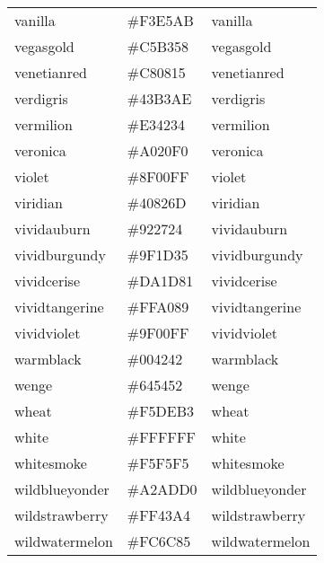 \documentclass[
]{article}
\begin{document}
\begin{longtable}[]{@{}lll@{}}
vanilla & \colorbox[rgb]{0.95,0.9,0.67}{\#F3E5AB} &
\textcolor[rgb]{0.95,0.9,0.67}{vanilla               }\tabularnewline
vegasgold & \colorbox[rgb]{0.77,0.7,0.35}{\#C5B358} &
\textcolor[rgb]{0.77,0.7,0.35}{vegasgold             }\tabularnewline
venetianred & \colorbox[rgb]{0.78,0.03,0.08}{\#C80815} &
\textcolor[rgb]{0.78,0.03,0.08}{venetianred           }\tabularnewline
verdigris & \colorbox[rgb]{0.26,0.7,0.68}{\#43B3AE} &
\textcolor[rgb]{0.26,0.7,0.68}{verdigris             }\tabularnewline
vermilion & \colorbox[rgb]{0.89,0.26,0.2}{\#E34234} &
\textcolor[rgb]{0.89,0.26,0.2}{vermilion             }\tabularnewline
veronica & \colorbox[rgb]{0.63,0.36,0.94}{\#A020F0} &
\textcolor[rgb]{0.63,0.36,0.94}{veronica              }\tabularnewline
violet & \colorbox[rgb]{0.56,0.0,1.0}{\#8F00FF} &
\textcolor[rgb]{0.56,0.0,1.0}{violet                }\tabularnewline
viridian & \colorbox[rgb]{0.25,0.51,0.43}{\#40826D} &
\textcolor[rgb]{0.25,0.51,0.43}{viridian              }\tabularnewline
vividauburn & \colorbox[rgb]{0.58,0.15,0.14}{\#922724} &
\textcolor[rgb]{0.58,0.15,0.14}{vividauburn           }\tabularnewline
vividburgundy & \colorbox[rgb]{0.62,0.11,0.21}{\#9F1D35} &
\textcolor[rgb]{0.62,0.11,0.21}{vividburgundy         }\tabularnewline
vividcerise & \colorbox[rgb]{0.85,0.11,0.51}{\#DA1D81} &
\textcolor[rgb]{0.85,0.11,0.51}{vividcerise           }\tabularnewline
vividtangerine & \colorbox[rgb]{1.0,0.63,0.54}{\#FFA089} &
\textcolor[rgb]{1.0,0.63,0.54}{vividtangerine        }\tabularnewline
vividviolet & \colorbox[rgb]{0.62,0.0,1.0}{\#9F00FF} &
\textcolor[rgb]{0.62,0.0,1.0}{vividviolet           }\tabularnewline
warmblack & \colorbox[rgb]{0.0,0.26,0.26}{\#004242} &
\textcolor[rgb]{0.0,0.26,0.26}{warmblack             }\tabularnewline
wenge & \colorbox[rgb]{0.39,0.33,0.32}{\#645452} &
\textcolor[rgb]{0.39,0.33,0.32}{wenge                 }\tabularnewline
wheat & \colorbox[rgb]{0.96,0.87,0.7}{\#F5DEB3} &
\textcolor[rgb]{0.96,0.87,0.7}{wheat                 }\tabularnewline
white & \colorbox[rgb]{1.0,1.0,1.0}{\#FFFFFF} &
\textcolor[rgb]{1.0,1.0,1.0}{white                 }\tabularnewline
whitesmoke & \colorbox[rgb]{0.96,0.96,0.96}{\#F5F5F5} &
\textcolor[rgb]{0.96,0.96,0.96}{whitesmoke            }\tabularnewline
wildblueyonder & \colorbox[rgb]{0.64,0.68,0.82}{\#A2ADD0} &
\textcolor[rgb]{0.64,0.68,0.82}{wildblueyonder        }\tabularnewline
wildstrawberry & \colorbox[rgb]{1.0,0.26,0.64}{\#FF43A4} &
\textcolor[rgb]{1.0,0.26,0.64}{wildstrawberry        }\tabularnewline
wildwatermelon & \colorbox[rgb]{0.99,0.42,0.52}{\#FC6C85} &
\textcolor[rgb]{0.99,0.42,0.52}{wildwatermelon        }\tabularnewline

\end{longtable}
\end{document}
